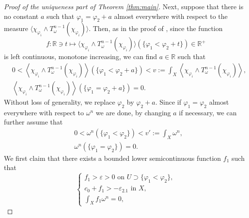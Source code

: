 \documentclass[10pt,a4paper]{amsart}
\numberwithin{equation}{section}
\begin{document}
\begin{proof}[Proof of the uniqueness part of Theorem \ref{thm:main}]
    Next, suppose that there is no constant $a$ such that $\varphi_1=\varphi_2+a$ almost everywhere with respect to the measure $\langle\chi_{\varphi_i}\wedge T^{n-1}_\omega(\chi_{\varphi_i})\rangle$. Then, as in the proof of \cite[Corollary 1.10]{GZ}, since the function
    $$f:\mathbb{R}\ni t\mapsto \langle\chi_{\varphi_i}\wedge T^{n-1}_\omega(\chi_{\varphi_i})\rangle(\{\varphi_1<\varphi_2+t\})\in\mathbb{R}^+$$
    is left continuous, monotone increasing, we can find $a\in\mathbb{R}$ such that  
    \begin{equation}\label{eq:mass}
    \begin{split}
        &0<\left\langle\chi_{\varphi_i}\wedge T^{n-1}_\omega(\chi_{\varphi_i})\right\rangle(\{\varphi_1<\varphi_2+a\})<v:=\int_X\left\langle\chi_{\varphi_i}\wedge T^{n-1}_\omega(\chi_{\varphi_i})\right\rangle,\\
        &\left\langle\chi_{\varphi_i}\wedge T^{n-1}_\omega(\chi_{\varphi_i})\right\rangle(\{\varphi_1=\varphi_2+a\})=0.
    \end{split}
    \end{equation}
    Without loss of generality, we replace $\varphi_2$ by $\varphi_2+a$.
    Since if $\varphi_1=\varphi_2$ almost everywhere with respect to $\omega^n$ we are done, by changing $a$ if necessary, we can further assume that
    \begin{equation}\label{eq:lebesguemass}
        \begin{split}
        &0<\omega^n(\{\varphi_1<\varphi_2\})<v':=\int_X\omega^n,\\
        &\omega
        ^n(\{\varphi_1=\varphi_2\})=0.
    \end{split}
    \end{equation}
    We first claim that there exists a bounded lower semicontinuous function $f_1$ such that 
    \begin{equation}\label{eq:f_1}
        \begin{cases}
            f_1>\varepsilon>0 \text{ on } U\supset \{\varphi_1<\varphi_2\}, \\
            c_0+f_1>-\varepsilon_{2.1} \text{ in } X,  \\
            \int_X f_1 \omega^n=0,
        \end{cases}
    \end{equation}

\end{proof}
\end{document}
